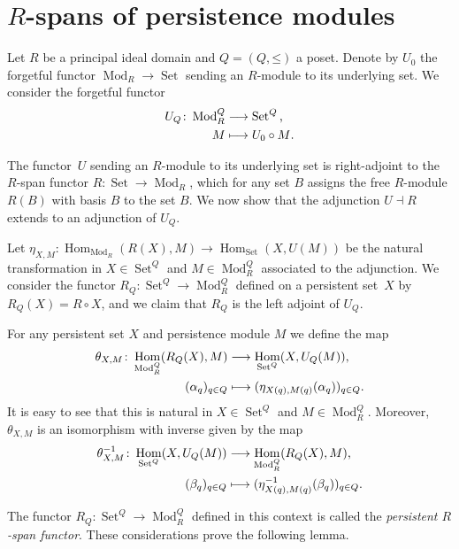 \documentclass[oneside]{amsart}
\theoremstyle{definition}
\DeclareMathOperator\Hom{Hom}
\newcommand\Set{\operatorname{Set}}
\newcommand\Mod[1]{\operatorname{Mod}_{#1}}
\begin{document}
\section{\texorpdfstring{$R$}{R}-spans of persistence modules}%
\label{section:RSpans}
Let $R$ be a principal ideal domain and $Q = (Q, \mathord\leq)$ a poset.
Denote by $U_0$ the forgetful functor $\Mod{R} \to \Set$ sending an $R$-module to its underlying set.
We consider the forgetful functor
\begin{align*}
    U_{Q}\colon \Mod{R}^Q &\longrightarrow \Set^Q \text, \\
    M &\longmapsto U_0 \circ M \text.
\end{align*}

The functor~$U$ sending an $R$-module to its underlying set is right-adjoint to the $R$-span functor $R\colon \Set \to \Mod{R}$, which for any set $B$ assigns the free $R$-module $R(B)$ with basis $B$ to the set $B$.
We now show that the adjunction $U \dashv R$ extends to an adjunction of $U_{Q}$.

Let $\eta_{X, M}\colon \Hom_{\Mod{R}}(R(X), M) \to \Hom_{\Set}(X, U(M))$ be the natural transformation in $X \in \Set^Q$ and $M \in \Mod{R}^Q$ associated to the adjunction.
We consider the functor $R_{Q}\colon \Set^{Q} \to \Mod{R}^{Q}$ defined on a persistent set~$X$ by $R_{Q}(X) = R \circ X$, and we claim that $R_{Q}$ is the left adjoint of $U_{Q}$.

For any persistent set $X$ and persistence module $M$ we define the map
\begin{align*}
    \theta_{X, M}\colon \Hom_{\Mod{R}^{Q}}(R_{Q}(X), M) &\longrightarrow \Hom_{\Set^{Q}}(X, U_{Q}(M)) \text, \\
    (\alpha_q)_{q \in Q} &\longmapsto (\eta_{X(q), M(q)}(\alpha_q))_{q \in Q} \text.
\end{align*}
It is easy to see that this is natural in $X \in \Set^{Q}$ and $M \in \Mod{R}^{Q}$.
Moreover, $\theta_{X,M}$ is an isomorphism with inverse given by the map
\begin{align*}
    \theta_{X,M}^{-1}\colon \Hom_{\Set^Q}(X, U_Q(M)) &\longrightarrow \Hom_{\Mod{R}^Q}(R_Q(X), M) \text, \\
    (\beta_q)_{q \in Q} &\longmapsto (\eta_{X(q), M(q)}^{-1}(\beta_q))_{q \in Q} \text.
\end{align*}

The functor $R_{Q}\colon \Set^{Q} \to \Mod{R}^{Q}$ defined in this context is called the \emph{persistent $R$-span functor}.
These considerations prove the following lemma.
\end{document}
